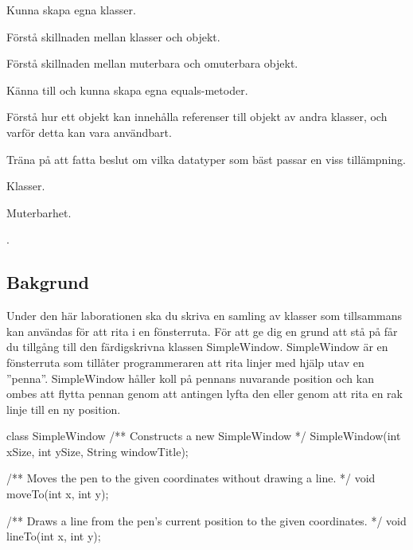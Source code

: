 

\Lab{\LabWeekSIX}

\begin{Goals}
\item Kunna skapa egna klasser.
\item Förstå skillnaden mellan klasser och objekt.
\item Förstå skillnaden mellan muterbara och omuterbara objekt.
\item Känna till och kunna skapa egna equals-metoder.
\item Förstå hur ett objekt kan innehålla referenser till objekt av andra klasser, och varför detta kan vara användbart.
\item Träna på att fatta beslut om vilka datatyper som bäst passar en viss tillämpning.
\end{Goals}

\begin{Preparations}
\item Klasser.
\item Muterbarhet.
\item .


\end{Preparations}

\subsection{Bakgrund}

Under den här laborationen ska du skriva en samling av klasser som tillsammans kan användas för att rita i en fönsterruta. För att ge dig en grund att stå på får du tillgång till den färdigskrivna klassen SimpleWindow. SimpleWindow är en fönsterruta som tillåter programmeraren att rita linjer med hjälp utav en  ''penna''. SimpleWindow håller koll på pennans nuvarande position och kan ombes att flytta pennan genom att antingen lyfta den eller genom att rita en rak linje till en ny position.

\begin{JavaSpec}{class SimpleWindow}
/** Constructs a new SimpleWindow */
SimpleWindow(int xSize, int ySize, String windowTitle);

/** Moves the pen to the given coordinates without
    drawing a line. */
void moveTo(int x, int y);

/** Draws a line from the pen's current position
    to the given coordinates. */
void lineTo(int x, int y);
\end{JavaSpec}


